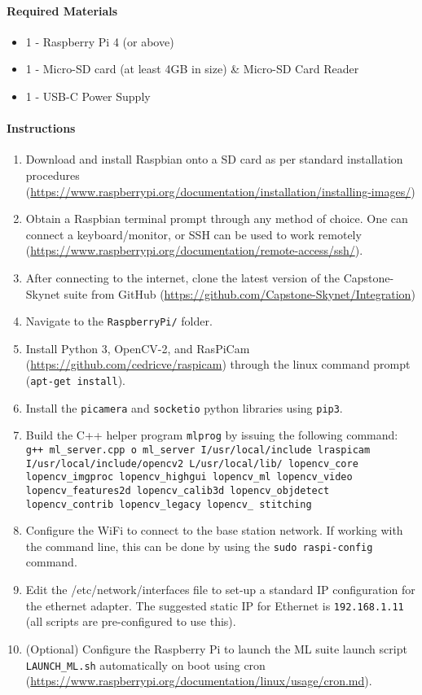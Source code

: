 \documentclass[10pt,letterpaper]{article}
\begin{document}
\paragraph{Required Materials}
\begin{itemize}
\item 1 - Raspberry Pi 4 (or above)
\item 1 - Micro-SD card (at least 4GB in size) \& Micro-SD Card Reader
\item 1 - USB-C Power Supply
\end{itemize}

\paragraph{Instructions}
\begin{enumerate}
\item Download and install Raspbian onto a SD card as per standard installation procedures (\url{https://www.raspberrypi.org/documentation/installation/installing-images/})
\item Obtain a Raspbian terminal prompt through any method of choice. One can connect a keyboard/monitor, or SSH can be used to work remotely (\url{https://www.raspberrypi.org/documentation/remote-access/ssh/}).
\item After connecting to the internet, clone the latest version of the Capstone-Skynet suite from GitHub (\url{https://github.com/Capstone-Skynet/Integration})
\item Navigate to the \texttt{RaspberryPi/} folder.
\item Install Python 3, OpenCV-2, and RasPiCam (\url{https://github.com/cedricve/raspicam}) through the linux command prompt (\texttt{apt-get install}). 
\item Install the \texttt{picamera} and \texttt{socketio} python libraries using \texttt{pip3}.
\item Build the C++ helper program \texttt{mlprog} by issuing the following command: \texttt{g++ ml\_server.cpp \-o ml\_server \-I/usr/local/include \-lraspicam \-I/usr/local/include/opencv2 \-L/usr/local/lib/ \-lopencv\_core \-lopencv\_imgproc \-lopencv\_highgui \-lopencv\_ml \-lopencv\_video \-lopencv\_features2d \-lopencv\_calib3d \-lopencv\_objdetect \-lopencv\_contrib \-lopencv\_legacy \-lopencv\_ stitching}
\item Configure the WiFi to connect to the base station network. If working with the command line, this can be done by using the \texttt{sudo raspi-config} command.
\item Edit the /etc/network/interfaces file to set-up a standard IP configuration for the ethernet adapter. The suggested static IP for Ethernet is \texttt{192.168.1.11}  (all scripts are pre-configured to use this).
\item (Optional) Configure the Raspberry Pi to launch the ML suite launch script \texttt{LAUNCH\_ML.sh} automatically on boot using cron (\url{https://www.raspberrypi.org/documentation/linux/usage/cron.md}).
\end{enumerate}
\end{document}
